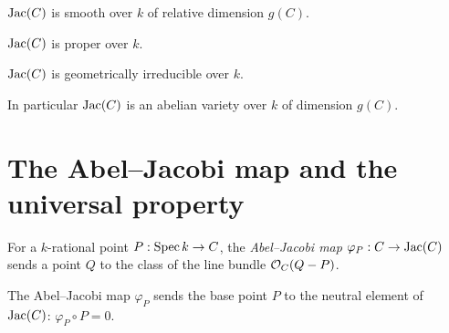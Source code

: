 \begin{theorem}
  \label{pa-thm:jacobian_smooth}

  \(\mathrm{Jac}(C)\) is smooth over \(k\) of relative dimension \(g(C)\).
\end{theorem}

\begin{theorem}
  \label{pa-thm:jacobian_proper}


  \(\mathrm{Jac}(C)\) is proper over \(k\).
\end{theorem}

\begin{theorem}
  \label{pa-thm:jacobian_geomirred}


  \(\mathrm{Jac}(C)\) is geometrically irreducible over \(k\).
\end{theorem}

In particular \(\mathrm{Jac}(C)\) is an abelian variety over \(k\) of dimension \(g(C)\).

\section{The Abel--Jacobi map and the universal property}

\begin{definition}
  \label{pa-def:ofCurve}

  For a \(k\)-rational point \(P : \operatorname{Spec} k \to C\), the \emph{Abel--Jacobi map}
  \(\varphi_P : C \to \mathrm{Jac}(C)\) sends a point \(Q\) to the class of the line bundle
  \(\mathcal{O}_{C}(Q - P)\).
\end{definition}

\begin{lemma}
  \label{pa-lem:comp_ofCurve}

  The Abel--Jacobi map \(\varphi_P\) sends the base point \(P\) to the neutral element of
  \(\mathrm{Jac}(C)\): \(\varphi_P \circ P = 0\).
\end{lemma}

